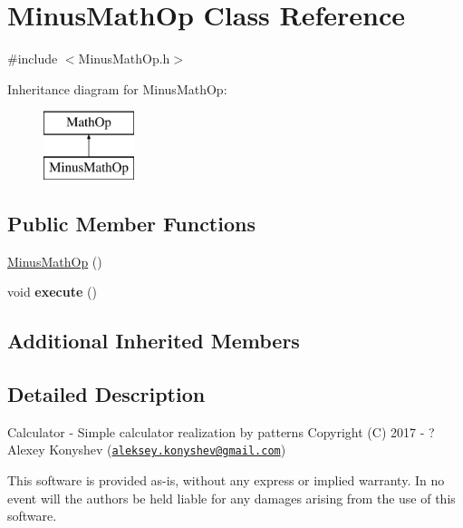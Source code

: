 \hypertarget{class_minus_math_op}{}\section{Minus\+Math\+Op Class Reference}
\label{class_minus_math_op}


{\ttfamily \#include $<$Minus\+Math\+Op.\+h$>$}

Inheritance diagram for Minus\+Math\+Op\+:\begin{figure}[H]
\begin{center}
\leavevmode
\includegraphics[height=2.000000cm]{class_minus_math_op}
\end{center}
\end{figure}
\subsection*{Public Member Functions}
\begin{DoxyCompactItemize}
\item 
\hyperlink{class_minus_math_op_ac49e813e50afbe1b642ce055f8df282c}{Minus\+Math\+Op} ()
\item 
\hypertarget{class_minus_math_op_a996c6bc342830c935e02c0752feb3500}{}void {\bfseries execute} ()\label{class_minus_math_op_a996c6bc342830c935e02c0752feb3500}

\end{DoxyCompactItemize}
\subsection*{Additional Inherited Members}


\subsection{Detailed Description}
Calculator -\/ Simple calculator realization by patterns Copyright (C) 2017 -\/ ? Alexey Konyshev (\href{mailto:aleksey.konyshev@gmail.com}{\tt aleksey.\+konyshev@gmail.\+com})

This software is provided \textquotesingle{}as-\/is\textquotesingle{}, without any express or implied warranty. In no event will the authors be held liable for any damages arising from the use of this software.

